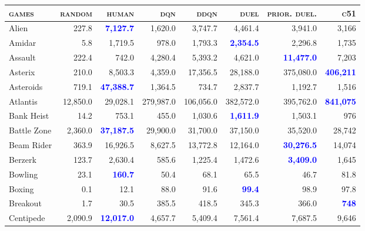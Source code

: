 \documentclass{article}
\begin{document}
\begin{figure}
\small
\centering
\begin{tabular}{ l | r|r|r|r|r|r| r }
  \textbf{\textsc{games}}  &  \textbf{\textsc{random}}  &  \textbf{\textsc{human}}  &  \textbf{\textsc{dqn}}  &  \textbf{\textsc{ddqn}}  &  \textbf{\textsc{duel}}  &  \textbf{\textsc{prior.}} \textbf{\textsc{duel.}}  &  \textbf{\textsc{c51}}\\
\hline
  Alien  &   227.8  &  \textbf{\textcolor{blue}{ 7,127.7}}  &   1,620.0  &   3,747.7  &   4,461.4  &   3,941.0  &  3,166\\
  Amidar  &   5.8  &   1,719.5  &   978.0  &   1,793.3  &  \textbf{\textcolor{blue}{ 2,354.5}}  &   2,296.8  &  1,735\\
  Assault  &   222.4  &   742.0  &   4,280.4  &   5,393.2  &   4,621.0  &  \textbf{\textcolor{blue}{ 11,477.0}}  &  7,203\\
  Asterix  &   210.0  &   8,503.3  &   4,359.0  &   17,356.5  &   28,188.0  &   375,080.0  &  \textbf{\textcolor{blue}{406,211}}\\
  Asteroids  &   719.1  &  \textbf{\textcolor{blue}{ 47,388.7}}  &   1,364.5  &   734.7  &   2,837.7  &   1,192.7  &  1,516\\
  Atlantis  &   12,850.0  &   29,028.1  &   279,987.0  &   106,056.0  &   382,572.0  &   395,762.0  &  \textbf{\textcolor{blue}{841,075}}\\
  Bank Heist  &   14.2  &   753.1  &   455.0  &   1,030.6  &  \textbf{\textcolor{blue}{ 1,611.9}}  &   1,503.1  &  976\\
  Battle Zone  &   2,360.0  &  \textbf{\textcolor{blue}{ 37,187.5}}  &   29,900.0  &   31,700.0  &   37,150.0  &   35,520.0  &  28,742\\
  Beam Rider  &   363.9  &   16,926.5  &   8,627.5  &   13,772.8  &   12,164.0  &  \textbf{\textcolor{blue}{ 30,276.5}}  &  14,074\\
  Berzerk  &   123.7  &   2,630.4  &   585.6  &   1,225.4  &   1,472.6  &  \textbf{\textcolor{blue}{ 3,409.0}}  &  1,645\\
  Bowling  &   23.1  &  \textbf{\textcolor{blue}{ 160.7}}  &   50.4  &   68.1  &   65.5  &   46.7  &  81.8\\
  Boxing  &   0.1  &   12.1  &   88.0  &   91.6  &  \textbf{\textcolor{blue}{ 99.4}}  &   98.9  &  97.8\\
  Breakout  &   1.7  &   30.5  &   385.5  &   418.5  &   345.3  &   366.0  &  \textbf{\textcolor{blue}{748}}\\
  Centipede  &   2,090.9  &  \textbf{\textcolor{blue}{ 12,017.0}}  &   4,657.7  &   5,409.4  &   7,561.4  &   7,687.5  &  9,646\\

\end{tabular}
\end{figure}
\end{document}
